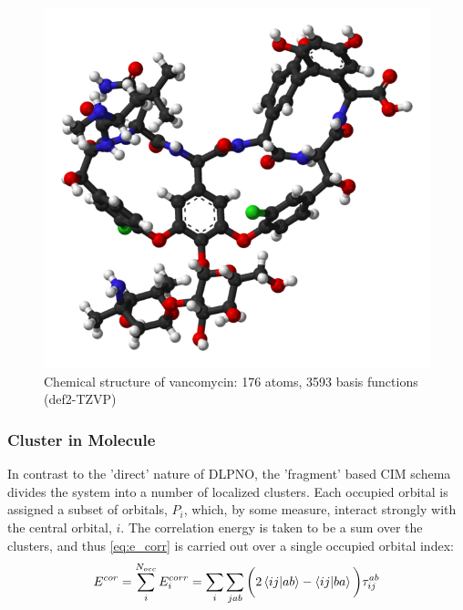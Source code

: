 \begin{figure}[H]
\centering
\includegraphics[scale=0.35]{images/Vanco.png}
\caption{Chemical structure of vancomycin: 176 atoms, 3593 basis functions (def2-TZVP)}
\label{vanco}
\end{figure}
\subsubsection{Cluster in Molecule}
In contrast to the 'direct' nature of DLPNO, the 'fragment' based CIM schema divides the system into a number of localized clusters. Each occupied orbital is assigned a subset of orbitals, $P_i$, which, by some measure, interact strongly with the central orbital, $i$. The correlation energy is taken to be a sum over the clusters, and thus \cref{eq:e_corr} is carried out over a single occupied orbital index:
\begin{equation}
E^{cor} =\sum_i^{N_{occ}} E^{corr}_{i} = \sum_{i} \sum_{jab} \bigg( 2 \braket{ij|ab} - \braket{ij|ba}\bigg) \tau^{ab}_{ij}
\end{equation}

